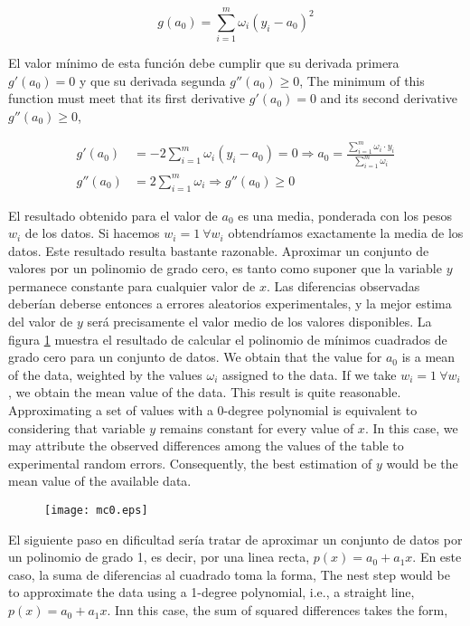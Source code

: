\begin{equation*}
g(a_0)=\sum_{i=1}^m \omega_i \left(y_i-a_0\right)^2
\end{equation*}
\begin{paracol}{2}
El valor mínimo de esta función debe cumplir que su derivada primera $g'(a_0)=0$ y que su derivada segunda  $g''(a_0)\geq 0$,
\switchcolumn
The minimum of this function must meet that its first derivative $g'(a_0)=0$ and its second derivative  $g''(a_0)\geq 0$,
\end{paracol}
\begin{align*}
g'(a_0)&=-2\sum_{i=1}^m \omega_i \left(y_i-a_0\right)=0 \Rightarrow a_0=\frac{\sum_{i=1}^m \omega_i\cdot y_i}{ \sum_{i=1}^m \omega_i}\\
g''(a_0)&=2\sum_{i=1}^m \omega_i \Rightarrow  g''(a_0) \geq 0
\end{align*}
\begin{paracol}{2}
El resultado obtenido para el valor de $a_0$ es una media, ponderada con los pesos $w_i$ de los datos. Si hacemos $w_i=1 \ \forall w_i$ obtendríamos exactamente la media de los datos. Este resultado resulta bastante razonable. Aproximar un conjunto de valores por un polinomio de grado cero, es tanto como suponer que la variable $y$ permanece constante para cualquier valor de $x$. Las diferencias observadas deberían deberse entonces a errores aleatorios experimentales, y la mejor estima del valor de $y$ será precisamente el valor medio de los valores disponibles. La figura \ref{fig:mc0} muestra el resultado de  calcular el polinomio de mínimos cuadrados de grado cero para un conjunto de datos.
\switchcolumn
We obtain that the value for $a_0$ is a mean of the data, weighted by the values $\omega_i$ assigned to the data. If we take  $w_i=1 \ \forall w_i$, we obtain the mean value of the data. This result is quite reasonable. Approximating a set of values with a 0-degree polynomial is equivalent to considering that variable $y$ remains constant for every value of $x$. In this case, we may attribute the observed differences among the values of the table to experimental random errors. Consequently, the best estimation of $y$ would be the mean value of the available data.       
\end{paracol}
\begin{figure}[h]
\centering
\texttt{[image: mc0.eps]}
\label{fig:mc0}
\end{figure} 
\begin{paracol}{2}
El siguiente paso en dificultad sería tratar de aproximar un conjunto de datos por un polinomio de grado 1, es decir, por una linea recta, $p(x)=a_0+a_1 x$. En este caso, la suma de diferencias al cuadrado toma la forma,
\switchcolumn The nest step would be to approximate the data using a 1-degree polynomial, i.e., a straight line, $p(x) = a_0+a_1x$. Inn this case, the sum of squared differences takes the form,
\end{paracol}
